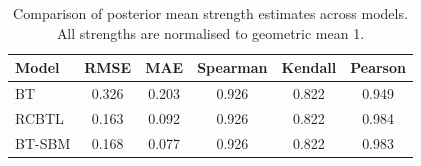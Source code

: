 \begin{table}[!h]
\centering
\caption{Comparison of posterior mean strength estimates across models. All strengths are normalised to geometric mean 1.}
\centering
\begin{tabular}[t]{lccccc}
\toprule
Model & RMSE & MAE & Spearman & Kendall & Pearson\\
\midrule
BT & 0.326 & 0.203 & 0.926 & 0.822 & 0.949\\
RCBTL & 0.163 & 0.092 & 0.926 & 0.822 & 0.984\\
BT-SBM & 0.168 & 0.077 & 0.926 & 0.822 & 0.983\\
\bottomrule
\end{tabular}
\end{table}
